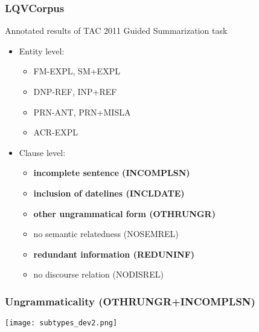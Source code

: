 \documentclass[table]{beamer}
\begin{document}
\begin{frame}
  \frametitle{LQVCorpus \citep{friedrichlqvsumm}}
  Annotated results of TAC 2011 Guided Summarization task \citep{owczarzak2011overview}
\pause
  \begin{itemize}
    \item Entity level:
    \begin{itemize}
      \item FM-EXPL, SM+EXPL%
      \item DNP-REF, INP+REF%
      \item PRN-ANT, PRN+MISLA%
      \item ACR-EXPL%
    \end{itemize}\pause
    \item Clause level:
    \begin{itemize}
      \item \textbf{incomplete sentence (INCOMPLSN)}
      \item \textbf{inclusion of datelines (INCLDATE)}
      \item \textbf{other ungrammatical form (OTHRUNGR)}
      \item no semantic relatedness (NOSEMREL)
      \item \textbf{redundant information (REDUNINF)}
      \item no discourse relation (NODISREL)
    \end{itemize}
  \end{itemize}
\end{frame}

\begin{frame}
  \frametitle{Ungrammaticality (OTHRUNGR+INCOMPLSN)}
  \begin{center}
    \texttt{[image: subtypes\_dev2.png]}
  \end{center}
\end{frame}
\end{document}
